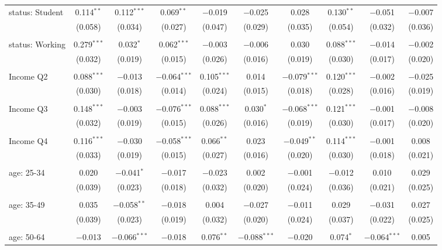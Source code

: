\begin{tabular}{@{\extracolsep{5pt}}lccccccccc}
 status: Student & 0.114$^{**}$ & 0.112$^{***}$ & 0.069$^{**}$ & $-$0.019 & $-$0.025 & 0.028 & 0.130$^{**}$ & $-$0.051 & $-$0.007 \\ 
  & (0.058) & (0.034) & (0.027) & (0.047) & (0.029) & (0.035) & (0.054) & (0.032) & (0.036) \\ 
  & & & & & & & & & \\ 
 status: Working & 0.279$^{***}$ & 0.032$^{*}$ & 0.062$^{***}$ & $-$0.003 & $-$0.006 & 0.030 & 0.088$^{***}$ & $-$0.014 & $-$0.002 \\ 
  & (0.032) & (0.019) & (0.015) & (0.026) & (0.016) & (0.019) & (0.030) & (0.017) & (0.020) \\ 
  & & & & & & & & & \\ 
 Income Q2 & 0.088$^{***}$ & $-$0.013 & $-$0.064$^{***}$ & 0.105$^{***}$ & 0.014 & $-$0.079$^{***}$ & 0.120$^{***}$ & $-$0.002 & $-$0.025 \\ 
  & (0.030) & (0.018) & (0.014) & (0.024) & (0.015) & (0.018) & (0.028) & (0.016) & (0.019) \\ 
  & & & & & & & & & \\ 
 Income Q3 & 0.148$^{***}$ & $-$0.003 & $-$0.076$^{***}$ & 0.088$^{***}$ & 0.030$^{*}$ & $-$0.068$^{***}$ & 0.121$^{***}$ & $-$0.001 & $-$0.008 \\ 
  & (0.032) & (0.019) & (0.015) & (0.026) & (0.016) & (0.019) & (0.030) & (0.017) & (0.020) \\ 
  & & & & & & & & & \\ 
 Income Q4 & 0.116$^{***}$ & $-$0.030 & $-$0.058$^{***}$ & 0.066$^{**}$ & 0.023 & $-$0.049$^{**}$ & 0.114$^{***}$ & $-$0.001 & 0.008 \\ 
  & (0.033) & (0.019) & (0.015) & (0.027) & (0.016) & (0.020) & (0.030) & (0.018) & (0.021) \\ 
  & & & & & & & & & \\ 
 age: 25-34 & 0.020 & $-$0.041$^{*}$ & $-$0.017 & $-$0.023 & 0.002 & $-$0.001 & $-$0.012 & 0.010 & 0.029 \\ 
  & (0.039) & (0.023) & (0.018) & (0.032) & (0.020) & (0.024) & (0.036) & (0.021) & (0.025) \\ 
  & & & & & & & & & \\ 
 age: 35-49 & 0.035 & $-$0.058$^{**}$ & $-$0.018 & 0.004 & $-$0.027 & $-$0.011 & 0.029 & $-$0.031 & 0.027 \\ 
  & (0.039) & (0.023) & (0.019) & (0.032) & (0.020) & (0.024) & (0.037) & (0.022) & (0.025) \\ 
  & & & & & & & & & \\ 
 age: 50-64 & $-$0.013 & $-$0.066$^{***}$ & $-$0.018 & 0.076$^{**}$ & $-$0.088$^{***}$ & $-$0.020 & 0.074$^{*}$ & $-$0.064$^{***}$ & 0.005 \\ 

\end{tabular}
